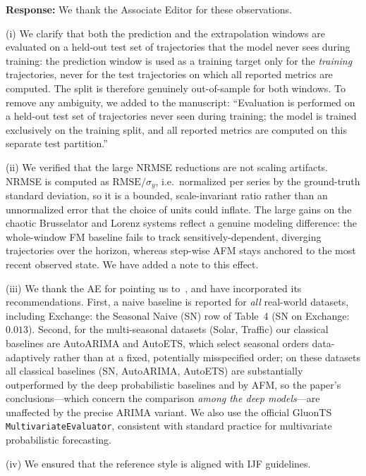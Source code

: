 \documentclass[11pt]{article}
\newcommand{\authorresponse}[1]{%
  \textbf{Response:} #1\par\medskip
}
\begin{document}
\authorresponse{%
We thank the Associate Editor for these observations.

(i) We clarify that both the prediction and the extrapolation windows are evaluated on a held-out test set of trajectories that the model never sees during training: the prediction window is used as a training target only for the \emph{training} trajectories, never for the test trajectories on which all reported metrics are computed. The split is therefore genuinely out-of-sample for both windows. To remove any ambiguity, we added to the manuscript: ``Evaluation is performed on a held-out test set of trajectories never seen during training; the model is trained exclusively on the training split, and all reported metrics are computed on this separate test partition.''

(ii) We verified that the large NRMSE reductions are not scaling artifacts. NRMSE is computed as $\text{RMSE}/\sigma_y$, i.e.\ normalized per series by the ground-truth standard deviation, so it is a bounded, scale-invariant ratio rather than an unnormalized error that the choice of units could inflate. The large gains on the chaotic Brusselator and Lorenz systems reflect a genuine modeling difference: the whole-window FM baseline fails to track sensitively-dependent, diverging trajectories over the horizon, whereas step-wise AFM stays anchored to the most recent observed state. We have added a note to this effect.

(iii) We thank the AE for pointing us to~\cite{hewamalage2023forecast}, and have incorporated its recommendations. First, a naive baseline is reported for \emph{all} real-world datasets, including Exchange: the Seasonal Naive (SN) row of Table~4 (SN on Exchange: $0.013$). Second, for the multi-seasonal datasets (Solar, Traffic) our classical baselines are AutoARIMA and AutoETS, which select seasonal orders data-adaptively rather than at a fixed, potentially misspecified order; on these datasets all classical baselines (SN, AutoARIMA, AutoETS) are substantially outperformed by the deep probabilistic baselines and by AFM, so the paper's conclusions---which concern the comparison \emph{among the deep models}---are unaffected by the precise ARIMA variant. We also use the official GluonTS \texttt{MultivariateEvaluator}, consistent with standard practice for multivariate probabilistic forecasting.

(iv) We ensured that the reference style is aligned with IJF guidelines.

}

\end{document}
